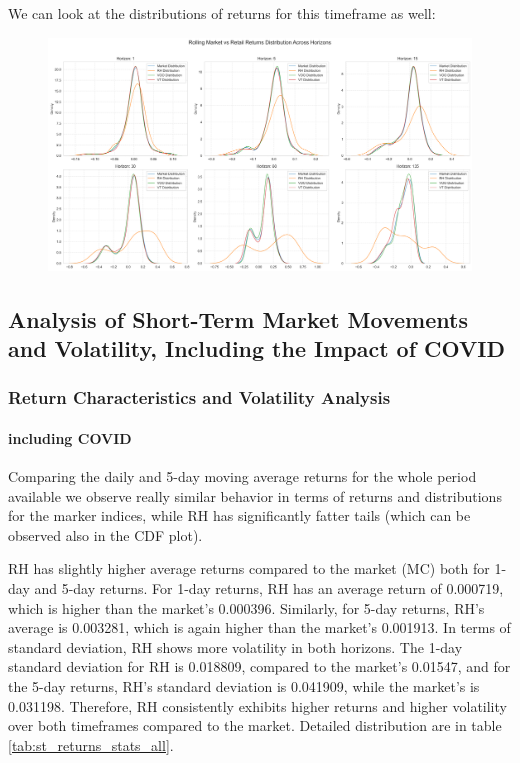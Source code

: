 We can look at the distributions of returns for this timeframe as well:
\begin{figure}[H]
    \centering
    \includegraphics[width=1\linewidth]{../images/distributions_comparison_pandemic.png}
\end{figure}

\subsection{Analysis of Short-Term Market Movements and Volatility, Including the Impact of COVID}

\subsubsection{Return Characteristics and Volatility Analysis}
\paragraph{including COVID}
Comparing the daily and 5-day moving average returns for the whole period available we observe really similar behavior in terms of returns and distributions for the marker indices,
while RH has significantly fatter tails (which can be observed also in the CDF plot).

RH has slightly higher average returns compared to the market (MC) both for 1-day and 5-day returns. For 1-day returns, RH has an average return of 0.000719, which is higher than the market's 0.000396. 
Similarly, for 5-day returns, RH's average is 0.003281, which is again  higher than the market's 0.001913. 
In terms of standard deviation, RH shows more volatility in both horizons. 
The 1-day standard deviation for RH is 0.018809, compared to the market's 0.01547, and for the 5-day returns, RH's standard deviation is 0.041909, while the market's is 0.031198. 
Therefore, RH consistently exhibits higher returns and higher volatility over both timeframes compared to the market. Detailed distribution are in table \ref{tab:st_returns_stats_all}.

